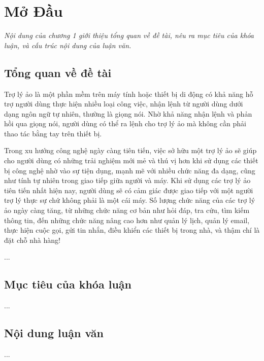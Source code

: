 
\chapter{Mở Đầu }
\textit{Nội dung của chương 1 giới thiệu tổng quan về đề tài, nêu ra mục tiêu của khóa luận, và cấu trúc nội dung của luận văn.}
\ifpdf
    \graphicspath{{Chapter1/Chapter1Figs/PNG/}{Chapter1/Chapter1Figs/PDF/}{Chapter1/Chapter1Figs/}}
\else
    \graphicspath{{Chapter1/Chapter1Figs/EPS/}{Chapter1/Chapter1Figs/}}
\fi

\section{Tổng quan về đề tài}

Trợ lý ảo là một phần mềm trên máy tính hoặc thiết bị di động có khả năng hỗ trợ người dùng thực hiện nhiều loại công việc, nhận lệnh từ người dùng dưới dạng ngôn ngữ tự nhiên, thường là giọng nói. Nhờ khả năng nhận lệnh và phản hồi qua giọng nói, người dùng có thể ra lệnh cho trợ lý ảo mà không cần phải thao tác bằng tay trên thiết bị.

Trong xu hướng công nghệ ngày càng tiên tiến, việc sở hữu một trợ lý ảo sẽ giúp cho người dùng có những trải nghiệm mới mẻ và thú vị hơn khi sử dụng các thiết bị công nghệ nhờ vào sự tiện dụng, mạnh mẽ với nhiều chức năng đa dạng, cũng như tính tự nhiên trong giao tiếp giữa người và máy. Khi sử dụng các trợ lý ảo tiên tiến nhất hiện nay, người dùng sẽ có cảm giác được giao tiếp với một người trợ lý thực sự chứ không phải là một cái máy. Số lượng chức năng của các trợ lý ảo ngày càng tăng, từ những chức năng cơ bản như hỏi đáp, tra cứu, tìm kiếm thông tin, đến những chức năng nâng cao hơn như quản lý lịch, quản lý email, thực hiện cuộc gọi, gửi tin nhắn, điều khiển các thiết bị trong nhà, và thậm chí là đặt chỗ nhà hàng!

...

\section{Mục tiêu của khóa luận}

...

\section{Nội dung luận văn}

...
